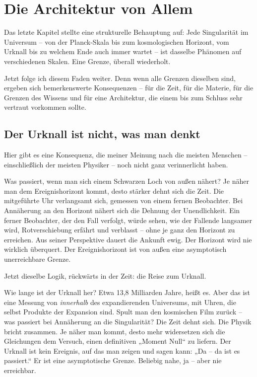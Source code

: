 \documentclass[11pt, twoside, openright]{book}
\begin{document}
\chapter{Die Architektur von Allem}

Das letzte Kapitel stellte eine strukturelle Behauptung auf: Jede Singularität im Universum -- von der Planck-Skala bis zum kosmologischen Horizont, vom Urknall bis zu welchem Ende auch immer wartet -- ist dasselbe Phänomen auf verschiedenen Skalen. Eine Grenze, überall wiederholt.

Jetzt folge ich diesem Faden weiter. Denn wenn alle Grenzen dieselben sind, ergeben sich bemerkenswerte Konsequenzen -- für die Zeit, für die Materie, für die Grenzen des Wissens und für eine Architektur, die einem bis zum Schluss sehr vertraut vorkommen sollte.


\section*{Der Urknall ist nicht, was man denkt}

Hier gibt es eine Konsequenz, die meiner Meinung nach die meisten Menschen -- einschließlich der meisten Physiker -- noch nicht ganz verinnerlicht haben.

Was passiert, wenn man sich einem Schwarzen Loch von außen nähert? Je näher man dem Ereignishorizont kommt, desto stärker dehnt sich die Zeit. Die mitgeführte Uhr verlangsamt sich, gemessen von einem fernen Beobachter. Bei Annäherung an den Horizont nähert sich die Dehnung der Unendlichkeit. Ein ferner Beobachter, der den Fall verfolgt, würde sehen, wie der Fallende langsamer wird, Rotverschiebung erfährt und verblasst -- ohne je ganz den Horizont zu erreichen. Aus seiner Perspektive dauert die Ankunft ewig. Der Horizont wird nie wirklich überquert. Der Ereignishorizont ist von außen eine asymptotisch unerreichbare Grenze.

Jetzt dieselbe Logik, rückwärts in der Zeit: die Reise zum Urknall.

Wie lange ist der Urknall her? Etwa 13,8 Milliarden Jahre, heißt es. Aber das ist eine Messung von \textit{innerhalb} des expandierenden Universums, mit Uhren, die selbst Produkte der Expansion sind. Spult man den kosmischen Film zurück -- was passiert bei Annäherung an die Singularität? Die Zeit dehnt sich. Die Physik bricht zusammen. Je näher man kommt, desto mehr widersetzen sich die Gleichungen dem Versuch, einen definitiven „Moment Null“ zu liefern. Der Urknall ist kein Ereignis, auf das man zeigen und sagen kann: „Da -- da ist es passiert.“ Er ist eine asymptotische Grenze. Beliebig nahe, ja -- aber nie erreichbar.
\end{document}
